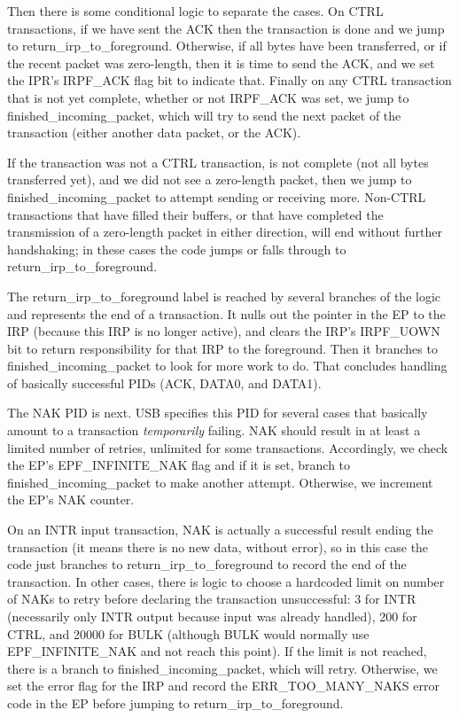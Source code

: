 Then there is some conditional logic to separate the cases.  On CTRL
transactions, if we have sent the ACK then the transaction is done and we
jump to return\_irp\_to\_foreground.  Otherwise, if all bytes have been
transferred, or if the recent packet was zero-length, then it is time to
send the ACK, and we set the IPR's IRPF\_ACK flag bit to indicate that. 
Finally on any CTRL transaction that is not yet complete, whether or not
IRPF\_ACK was set, we jump to finished\_incoming\_packet, which will try to
send the next packet of the transaction (either another data packet, or the
ACK).

If the transaction was not a CTRL transaction, is not complete (not all
bytes transferred yet), and we did not see a zero-length packet, then we
jump to finished\_incoming\_packet to attempt sending or receiving more. 
Non-CTRL transactions that have filled their buffers, or that have completed
the transmission of a zero-length packet in either direction, will end
without further handshaking; in these cases the code jumps or falls through
to return\_irp\_to\_foreground.

The return\_irp\_to\_foreground label is reached by several branches of the
logic and represents the end of a transaction.  It nulls out the pointer in
the EP to the IRP (because this IRP is no longer active), and clears the
IRP's IRPF\_UOWN bit to return responsibility for that IRP to the
foreground.  Then it branches to finished\_incoming\_packet to look for more
work to do.  That concludes handling of basically successful PIDs (ACK,
DATA0, and DATA1).

The NAK PID is next.  USB specifies this PID for several cases that
basically amount to a transaction \emph{temporarily} failing.  NAK should
result in at least a limited number of retries, unlimited for some
transactions.  Accordingly, we check the EP's EPF\_INFINITE\_NAK flag and if
it is set, branch to finished\_incoming\_packet to make another attempt. 
Otherwise, we increment the EP's NAK counter.

On an INTR input transaction, NAK is actually a successful result ending the
transaction (it means there is no new data, without error), so in this case
the code just branches to return\_irp\_to\_foreground to record the end of
the transaction.  In other cases, there is logic to choose a hardcoded limit
on number of NAKs to retry before declaring the transaction unsuccessful: 3
for INTR (necessarily only INTR output because input was already handled),
200 for CTRL, and 20000 for BULK (although BULK would normally use
EPF\_INFINITE\_NAK and not reach this point).  If the limit is not reached,
there is a branch to finished\_incoming\_packet, which will retry. 
Otherwise, we set the error flag for the IRP and record the
ERR\_TOO\_MANY\_NAKS error code in the EP before jumping to
return\_irp\_to\_foreground.

